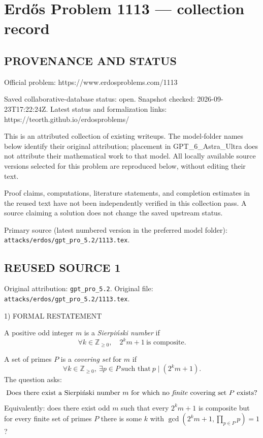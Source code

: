 \section*{Erd\H{o}s Problem 1113 --- collection record}

\subsection*{PROVENANCE AND STATUS}
Official problem: https://www.erdosproblems.com/1113

Saved collaborative-database status: open.
Snapshot checked: 2026-09-23T17:22:24Z.
Latest status and formalization links: https://teorth.github.io/erdosproblems/

This is an attributed collection of existing writeups. The model-folder names below identify their original attribution; placement in GPT\_6\_Astra\_Ultra does not attribute their mathematical work to that model. All locally available source versions selected for this problem are reproduced below, without editing their text.

Proof claims, computations, literature statements, and completion estimates in the reused text have not been independently verified in this collection pass. A source claiming a solution does not change the saved upstream status.

Primary source (latest numbered version in the preferred model folder): \texttt{attacks/erdos/gpt\_pro\_5.2/1113.tex}.

\subsection*{REUSED SOURCE 1}
Original attribution: \texttt{gpt\_pro\_5.2}.
Original file: \texttt{attacks/erdos/gpt\_pro\_5.2/1113.tex}.


1) FORMAL RESTATEMENT

A positive odd integer \(m\) is a \emph{Sierpi\'nski number} if
\[
\forall k\in\mathbb{Z}_{\ge 0},\quad 2^k m + 1\ \text{is composite}.
\]

A set of primes \(P\) is a \emph{covering set} for \(m\) if
\[
\forall k\in\mathbb{Z}_{\ge 0},\ \exists p\in P\ \text{such that}\ p\mid (2^k m+1).
\]
The question asks:
\[
\text{Does there exist a Sierpi\'nski number }m\text{ for which no \emph{finite} covering set }P\text{ exists?}
\]
Equivalently: does there exist odd \(m\) such that every \(2^k m+1\) is composite but for every finite set of primes \(P\) there is some \(k\) with \(\gcd(2^k m+1,\prod_{p\in P}p)=1\)?

